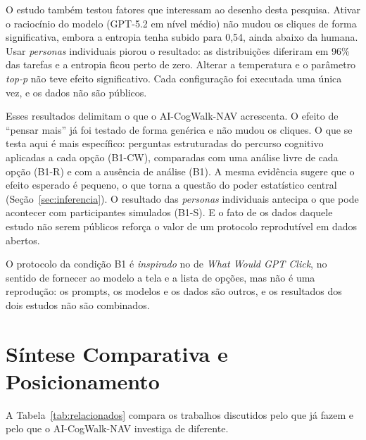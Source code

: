 \documentclass[12pt,oneside,a4paper,chapter=TITLE,english,brazil]{abntex2}
\newcommand{\proj}{AI-CogWalk-NAV}
\begin{document}
O estudo também testou fatores que interessam ao desenho desta pesquisa. Ativar o raciocínio do modelo (GPT-5.2 em nível médio) não mudou os cliques de forma significativa, embora a entropia tenha subido para 0,54, ainda abaixo da humana. Usar \textit{personas} individuais piorou o resultado: as distribuições diferiram em 96\% das tarefas e a entropia ficou perto de zero. Alterar a temperatura e o parâmetro \textit{top-p} não teve efeito significativo. Cada configuração foi executada uma única vez, e os dados não são públicos.

Esses resultados delimitam o que o \proj{} acrescenta. O efeito de ``pensar mais'' já foi testado de forma genérica e não mudou os cliques. O que se testa aqui é mais específico: perguntas estruturadas do percurso cognitivo aplicadas a cada opção (B1-CW), comparadas com uma análise livre de cada opção (B1-R) e com a ausência de análise (B1). A mesma evidência sugere que o efeito esperado é pequeno, o que torna a questão do poder estatístico central (Seção~\ref{sec:inferencia}). O resultado das \textit{personas} individuais antecipa o que pode acontecer com participantes simulados (B1-S). E o fato de os dados daquele estudo não serem públicos reforça o valor de um protocolo reprodutível em dados abertos.

O protocolo da condição B1 é \emph{inspirado} no de \textit{What Would GPT Click}, no sentido de fornecer ao modelo a tela e a lista de opções, mas não é uma reprodução: os prompts, os modelos e os dados são outros, e os resultados dos dois estudos não são combinados.

\section{Síntese Comparativa e Posicionamento}
\label{sec:diferenciais}

A Tabela~\ref{tab:relacionados} compara os trabalhos discutidos pelo que já fazem e pelo que o \proj{} investiga de diferente.
\end{document}
